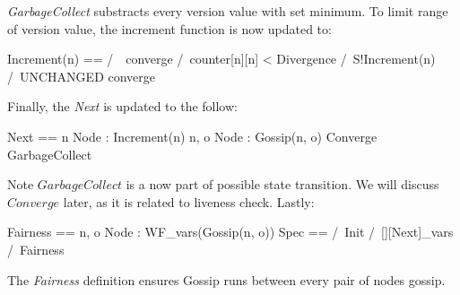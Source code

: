 \textit{GarbageCollect} substracts every version value with set minimum. To
limit range of version value, the increment function is now updated to: \newline
\begin{tla}
Increment(n) ==
    /\ ~converge
    /\ counter[n][n] < Divergence
    /\ S!Increment(n)
    /\ UNCHANGED converge
\end{tla}
\begin{tlatex}
%
%
%
%
%
\end{tlatex}
\newline

Finally, the \textit{Next} is updated to the follow:\newline

\begin{tla}
Next ==
    \/ \E n \in Node : Increment(n)
    \/ \E n, o \in Node : Gossip(n, o)
    \/ Converge
    \/ GarbageCollect
\end{tla}
\begin{tlatex}
%
%
%
%
%
\end{tlatex}

Note $GarbageCollect$ is a now part of possible state transition. We will
discuss $Converge$ later, as it is related to liveness check. Lastly:\newline

\begin{tla}
Fairness == \A n, o \in Node : WF_vars(Gossip(n, o))
Spec ==
    /\ Init
    /\ [][Next]_vars
    /\ Fairness
\end{tla}
\begin{tlatex}
%
%
%
%
\end{tlatex}
\newline

The \textit{Fairness} definition ensures Gossip runs between every pair of nodes
gossip.

